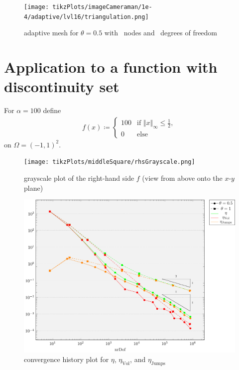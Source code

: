 \documentclass[draft=false,twoside,12pt]{scrreprt}
\begin{document}

\begin{figure}[H]
	\centering
  \texttt{[image: tikzPlots/imageCameraman/1e-4/adaptive/lvl16/triangulation.png]}
  \caption{adaptive mesh for $\theta = 0.5$ with \nrNodes\ nodes and 
  \nrDof\ degrees of freedom}
\end{figure}



\section{Application to a function with discontinuity set}
For $\alpha = 100$ define 
\begin{align}
  \label{equ:defMidSqu}
  f(x)\coloneqq 
  \begin{cases}
    100 &\text{if } \Vert x\Vert_\infty\leq \frac{1}{2},\\
    0 &\text{else}
  \end{cases}
\end{align}
on $\Omega = (-1,1)^2$.

\begin{figure}[H]
	\centering
	\texttt{[image: tikzPlots/middleSquare/rhsGrayscale.png]}
  \caption{grayscale plot of the right-hand side $f$ (view from above onto the
  $x$-$y$ plane)}
  \label{fig:rhsMiddleSquare}
\end{figure}

\begin{figure}[H]
	\centering
	\includegraphics[width=14cm]
  {tikzPlots/middleSquare/convergence.pdf}
  \caption{convergence history plot for $\eta$,
  $\eta_\text{Vol}$, and $\eta_\text{Jumps}$}
\end{figure}
\end{document}
